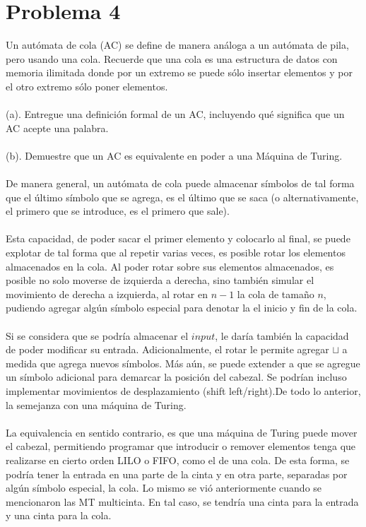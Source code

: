 \documentclass[spanish]{article}
\begin{document}
\section{Problema 4}
Un autómata de cola (AC) se define de manera análoga a un autómata de pila, pero usando una cola. Recuerde que una cola es una estructura de datos con memoria ilimitada donde por un extremo se puede sólo insertar elementos y por el otro extremo sólo poner elementos.
\\\\
(a). Entregue una definición formal de un AC, incluyendo qué significa que un AC acepte una palabra.
\\\\
(b). Demuestre que un AC es equivalente en poder a una Máquina de Turing.
\\\\
De manera general, un autómata de cola puede almacenar símbolos de tal forma que el último símbolo que se agrega, es el último que se saca (o alternativamente, el primero que se introduce, es el primero que sale). 
\\\\
Esta capacidad, de poder sacar el primer elemento y colocarlo al final, se puede explotar de tal forma que al repetir varias veces, es posible rotar los elementos almacenados en la cola. Al poder rotar sobre sus elementos almacenados, es posible no solo moverse de izquierda a derecha, sino también simular el movimiento de derecha a izquierda, al rotar en $n-1$ la cola de tamaño $n$, pudiendo agregar algún símbolo especial para denotar la el inicio y fin de la cola.
\\\\
Si se considera que se podría almacenar el $input$, le daría también la capacidad de poder modificar su entrada. Adicionalmente, el rotar le permite agregar $\sqcup$ a medida que agrega nuevos símbolos. Más aún, se puede extender a que se agregue un símbolo adicional para demarcar la posición del cabezal. Se podrían incluso implementar movimientos de desplazamiento (shift left/right).De todo lo anterior, la semejanza con una máquina de Turing. 
\\\\
La equivalencia en sentido contrario, es que una máquina de Turing puede mover el cabezal, permitiendo programar que introducir o remover elementos tenga que realizarse en cierto orden LILO o FIFO, como el de una cola. De esta forma, se podría tener la entrada en una parte de la cinta y en otra parte, separadas por algún símbolo especial, la cola. Lo mismo se vió anteriormente cuando se mencionaron las MT multicinta. En tal caso, se tendría una cinta para la entrada y una cinta para la cola.
\end{document}
